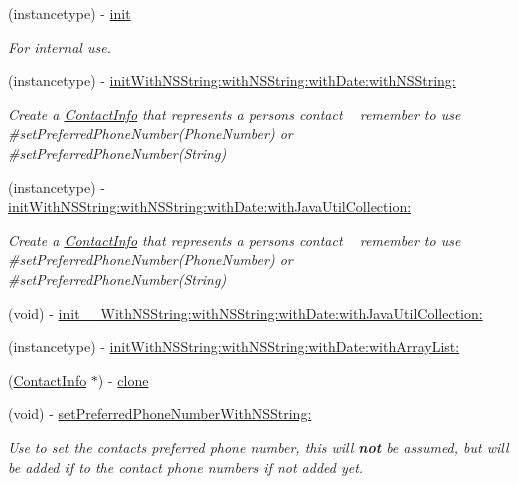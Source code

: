 \begin{DoxyCompactItemize}
\item 
(instancetype) -\/ \hyperlink{interface_contact_info_a4be099fdf5705e7db70ea153e716174d}{init}
\begin{DoxyCompactList}\small\item\em For internal use. \end{DoxyCompactList}\item 
(instancetype) -\/ \hyperlink{interface_contact_info_a2c5c78360dad69ed2c889047b1921125}{init\+With\+N\+S\+String\+:with\+N\+S\+String\+:with\+Date\+:with\+N\+S\+String\+:}
\begin{DoxyCompactList}\small\item\em Create a \hyperlink{interface_contact_info}{Contact\+Info} that represents a person\textquotesingle{}s contact ~\newline
 remember to use \#set\+Preferred\+Phone\+Number(\+Phone\+Number) or \#set\+Preferred\+Phone\+Number(\+String) \end{DoxyCompactList}\item 
(instancetype) -\/ \hyperlink{interface_contact_info_af932c9f22b893e1ebf450f28aac49424}{init\+With\+N\+S\+String\+:with\+N\+S\+String\+:with\+Date\+:with\+Java\+Util\+Collection\+:}
\begin{DoxyCompactList}\small\item\em Create a \hyperlink{interface_contact_info}{Contact\+Info} that represents a person\textquotesingle{}s contact ~\newline
 remember to use \#set\+Preferred\+Phone\+Number(\+Phone\+Number) or \#set\+Preferred\+Phone\+Number(\+String) \end{DoxyCompactList}\item 
(void) -\/ \hyperlink{interface_contact_info_a78552a7734920671d8d9a3279979738e}{init\+\_\+\+\_\+\+With\+N\+S\+String\+:with\+N\+S\+String\+:with\+Date\+:with\+Java\+Util\+Collection\+:}
\item 
(instancetype) -\/ \hyperlink{interface_contact_info_a5c337129db82ecbec2291024a95e6dd8}{init\+With\+N\+S\+String\+:with\+N\+S\+String\+:with\+Date\+:with\+Array\+List\+:}
\item 
(\hyperlink{interface_contact_info}{Contact\+Info} $\ast$) -\/ \hyperlink{interface_contact_info_ae94da2f6b9f53e9321d5060829d6fbab}{clone}
\item 
(void) -\/ \hyperlink{interface_contact_info_a3fcb8137d5c962bd93e0a26dc1cff9bb}{set\+Preferred\+Phone\+Number\+With\+N\+S\+String\+:}
\begin{DoxyCompactList}\small\item\em Use to set the contact\textquotesingle{}s preferred phone number, this will {\bfseries not} be assumed, but will be added if to the contact phone numbers if not added yet. \end{DoxyCompactList}\item 

\end{DoxyCompactItemize}
